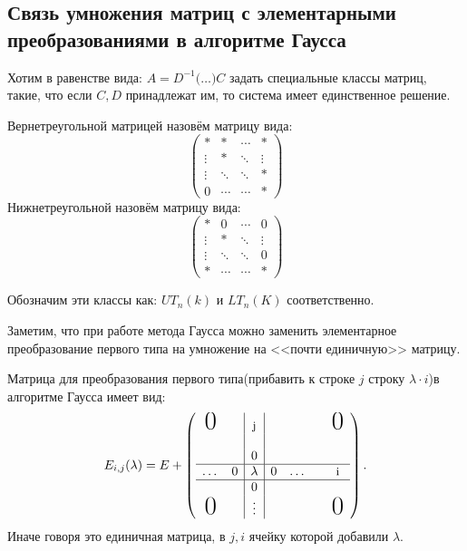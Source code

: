 \subsection{Связь умножения матриц с элементарными преобразованиями в алгоритме Гаусса}
\begin{motivation}
    Хотим в равенстве вида:
    $A = D^{-1}\big(\dots\big)C$
    задать специальные классы матриц, такие, что если
    $C,D$ принадлежат им, то система имеет единственное решение.
\end{motivation}
\begin{definition}
    Вернетреугольной матрицей назовём матрицу вида:$$\begin{pmatrix}
        * & * & \cdots & *\\
        \vdots & * & \ddots & \vdots\\
        \vdots & \ddots & \ddots & *\\
        0 & \cdots& \cdots& *
    \end{pmatrix}
    $$
    Нижнетреугольной назовём матрицу вида: $$\begin{pmatrix}
        * & 0 & \cdots & 0\\
        \vdots & * & \ddots & \vdots\\
        \vdots & \ddots & \ddots & 0\\
        * & \cdots& \cdots& *
    \end{pmatrix}
    $$

    Обозначим эти классы как: $UT_n(k)$ и $LT_n(K)$ соответственно.
\end{definition}
\begin{remark}
    Заметим, что при работе метода Гаусса
    можно заменить элементарное преобразование первого типа на 
    умножение на <<почти единичную>> матрицу.
\end{remark}
\begin{definition}
    Матрица для преобразования первого типа(прибавить
    к строке $j$ строку $\lambda \cdot i$)в алгоритме
    Гаусса имеет вид: 
    \[
        E_{i,j}(\lambda) = E +
        \left(\begin{array}{cc|c|cccc}
            \text{\huge 0}&&\text{\small j}&&&&\text{\huge 0}\\
            &&&&&&\\
            &&0&&&&\\
            \hline
            \dots&0&\lambda&0&\dots&&\text{\small i}\\
            \hline
            &&0&&&\\
            \text{\huge 0}&&\vdots&&&&\text{\huge 0}\\
        \end{array}\right) 
    .\] 
    Иначе говоря это единичная матрица, в $j, i$ ячейку 
    которой добавили $\lambda$.
\end{definition}

